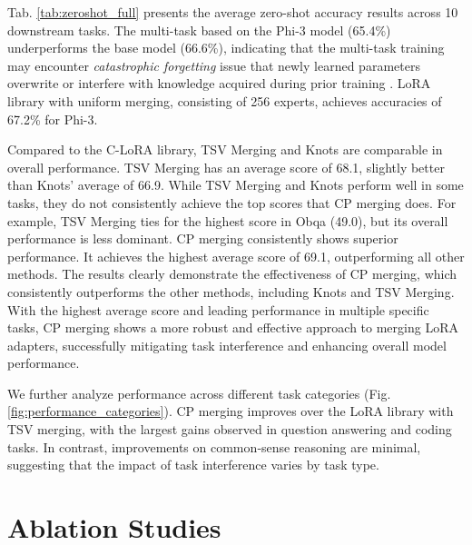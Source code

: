 \documentclass[10pt]{article} %
\begin{document}
 

    Tab. \ref{tab:zeroshot_full} presents the average zero-shot accuracy results
    across 10 downstream tasks. The multi-task based on the Phi-3 model (65.4\%)
    underperforms the base model (66.6\%), indicating that the multi-task
    training may encounter \textit{catastrophic forgetting} issue that newly learned
    parameters overwrite or interfere with knowledge acquired during prior training
    \citep{wang2024comprehensive}. LoRA library with uniform merging, consisting
    of 256 experts,  achieves accuracies of 67.2\% for Phi-3. 



    Compared to the C-LoRA library, TSV Merging and Knots are comparable in overall performance. TSV Merging has an average score of 68.1, slightly better than Knots' average of 66.9. While TSV Merging and Knots perform well in some tasks, they do not consistently achieve the top scores that CP merging does. For example, TSV Merging ties for the highest score in Obqa (49.0), but its overall performance is less dominant. CP merging consistently shows superior performance. It achieves the highest average score of 69.1, outperforming all other methods. The results clearly demonstrate the effectiveness of CP merging, which consistently outperforms the other methods, including Knots and TSV Merging. With the highest average score and leading performance in multiple specific tasks, CP merging shows a more robust and effective approach to merging LoRA adapters, successfully mitigating task interference and enhancing overall model performance.

    We further analyze performance across different task categories (Fig. \ref{fig:performance_categories}).
    CP merging improves over the LoRA library with TSV merging, with the largest gains observed in question answering and coding tasks. In contrast,
    improvements on common‑sense reasoning are minimal, suggesting that the impact
    of task interference varies by task type.

\section{Ablation Studies}

\end{document}
